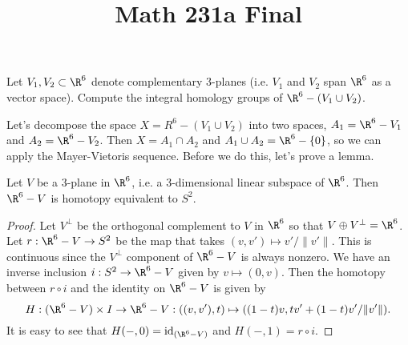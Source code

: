 \documentclass[11pt,letterpaper]{article}
\title{\textbf{Math 231a Final}}
\begin{document}
\maketitle

\begin{problem}
    Let $V_1,V_2 \subset\R^6$ denote complementary $3$-planes (i.e. $V_1$ and $V_2$ span $\R^6$ as a vector space). Compute the integral homology groups of $\R^6 - (V_1 \cup V_2)$.
\end{problem}

\begin{solution}
    \quad Let's decompose the space $X=R^6 - (V_1\cup V_2)$ into two spaces, $A_1 = \R^6 - V_1$ and $A_2 = \R^6 - V_2$. Then $X = A_1\cap A_2$ and $A_1\cup A_2 = \R^6 - \{0\}$, so we can apply the Mayer-Vietoris sequence. Before we do this, let's prove a lemma.

    \begin{claim}
        Let $V$ be a $3$-plane in $\R^6$, i.e. a 3-dimensional linear subspace of $\R^6$. Then $\R^6 - V$ is homotopy equivalent to $S^2$.
    \end{claim}

    \begin{proof}
        Let $V^\perp$ be the orthogonal complement to $V$ in $\R^6$ so that $V\oplus V^\perp = \R^6$. Let $r : \R^6 - V \to S^2$ be the map that takes $(v, v') \mapsto v' / \|v'\|$. This is continuous since the $V^\perp$ component of $\R^6 -V$ is always nonzero. We have an inverse inclusion $i : S^2 \to \R^6-V$ given by $v \mapsto (0, v)$. Then the homotopy between $r\circ i$ and the identity on $\R^6-V$ is given by
        \[
            H : (\R^6 - V)\times I \to \R^6 - V : ((v,v'), t) \mapsto ((1-t)v, tv'+(1-t)v' / \|v'\|)
        .\]
        It is easy to see that $H(-,0) = \text{id}_{(\R^6 - V)}$ and $H(-,1) = r\circ i$. 
    \end{proof}


\end{solution}
\end{document}
